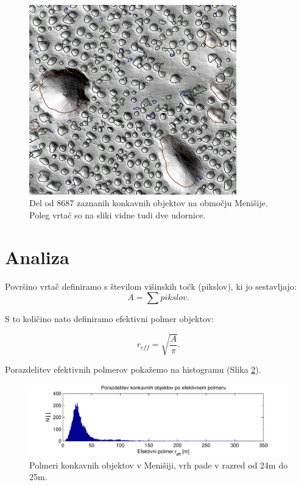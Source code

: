 \documentclass[a4paper, twoside, 12pt]{book}
\begin{document}
  \begin{figure}[h]
    \begin{center}
      \includegraphics[width=9cm]{slike/menisija-vrtace}
    \end{center}
    \caption{Del od 8687 zaznanih konkavnih objektov na območju Menišije. Poleg vrtač so na sliki vidne tudi dve udornice.}
    \label{fig:menisija-vrtace}
  \end{figure}

  \section{Analiza}

  Površino vrtač definiramo s številom višinskih točk (pikslov), ki jo sestavljajo:
    \begin{equation}
      A = \sum pikslov.
    \end{equation}

S to količino nato definiramo efektivni polmer objektov:

    \begin{equation} 
      r_{eff} = \sqrt{\frac{A}{\pi}}. 
    \end{equation}

Porazdelitev efektivnih polmerov pokažemo na histogramu (Slika \ref{fig:menisija-polmeri-hist}).

  \begin{figure}[h]
    \begin{center}
      \includegraphics[width=14cm]{slike/menisija-polmeri-hist}
    \end{center}
    \caption{Polmeri konkavnih objektov v Menišiji, vrh pade v razred od 24m do 25m.}
    \label{fig:menisija-polmeri-hist}
  \end{figure}
\end{document}
